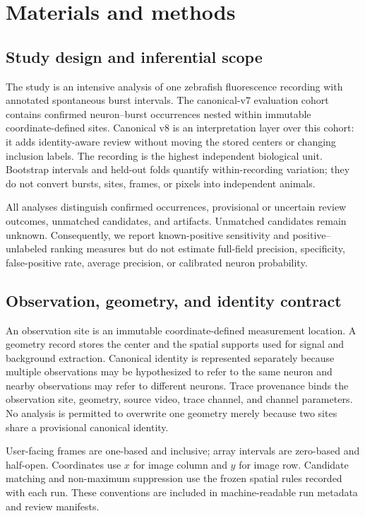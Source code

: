 \section{Materials and methods}

\subsection{Study design and inferential scope}

The study is an intensive analysis of one zebrafish fluorescence recording with
\VenueCohortBursts{} annotated spontaneous burst intervals. The canonical-v7
evaluation cohort contains \VenueCohortOccurrences{} confirmed neuron--burst
occurrences nested within \VenueCohortSites{} immutable coordinate-defined
sites. Canonical v8 is an interpretation layer over this
cohort: it adds identity-aware review without moving the stored centers or
changing inclusion labels. The recording is the highest independent biological
unit. Bootstrap intervals and held-out folds quantify within-recording
variation; they do not convert bursts, sites, frames, or pixels into independent
animals.

All analyses distinguish confirmed occurrences, provisional or uncertain review
outcomes, unmatched candidates, and artifacts. Unmatched candidates remain
unknown. Consequently, we report known-positive sensitivity and
positive--unlabeled ranking measures but do not estimate full-field precision,
specificity, false-positive rate, average precision, or calibrated neuron
probability.

\subsection{Observation, geometry, and identity contract}

An observation site is an immutable coordinate-defined measurement location. A
geometry record stores the center and the spatial supports used for signal and
background extraction. Canonical identity is represented separately because
multiple observations may be hypothesized to refer to the same neuron and
nearby observations may refer to different neurons. Trace provenance binds the
observation site, geometry, source video, trace channel, and channel parameters.
No analysis is permitted to overwrite one geometry merely because two sites
share a provisional canonical identity.

User-facing frames are one-based and inclusive; array intervals are zero-based
and half-open. Coordinates use $x$ for image column and $y$ for image row.
Candidate matching and non-maximum suppression use the frozen spatial rules
recorded with each run. These conventions are included in machine-readable run
metadata and review manifests.

